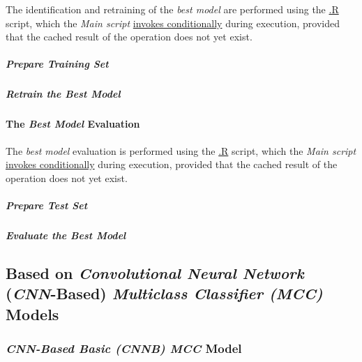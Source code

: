 \documentclass[
]{report}
\begin{document}
\hfill\break

The identification and retraining of the \emph{best model} are performed using the \href{}{.R} script, which the \emph{Main script} \href{https://github.com/AzKurban-edX-DS/edx.capstone.choose-your-own/blob/main/r/index.R\#L}{invokes conditionally} during execution, provided that the cached result of the operation does not yet exist.

\subparagraph{\texorpdfstring{Prepare \emph{Training Set}}{Prepare Training Set}}\label{tdnn.retrain.train_set}

\hfill\break

\subparagraph{\texorpdfstring{Retrain the \emph{Best Model}}{Retrain the Best Model}}\label{tdnn.best.retrain}

\hfill\break

\paragraph{\texorpdfstring{The \emph{Best Model} Evaluation}{The Best Model Evaluation}}\label{tdnn.evaluation_best}

\hfill\break

The \emph{best model} evaluation is performed using the \href{}{.R} script, which the \emph{Main script} \href{https://github.com/AzKurban-edX-DS/edx.capstone.choose-your-own/blob/main/r/index.R\#L}{invokes conditionally} during execution, provided that the cached result of the operation does not yet exist.

\subparagraph{\texorpdfstring{Prepare \emph{Test Set}}{Prepare Test Set}}\label{tdnn.eval.test_set}

\hfill\break

\subparagraph{\texorpdfstring{Evaluate the \emph{Best Model}}{Evaluate the Best Model}}\label{tdnn.best.eval}

\hfill\break

\newpage

\subsection{\texorpdfstring{Based on \emph{Convolutional Neural Network} (\emph{CNN}-Based) \emph{Multiclass Classifier (MCC)} Models}{Based on Convolutional Neural Network (CNN-Based) Multiclass Classifier (MCC) Models}}\label{based-on-convolutional-neural-network-cnn-based-multiclass-classifier-mcc-models}

\subsubsection{\texorpdfstring{\emph{CNN-Based Basic (CNNB) MCC} Model}{CNN-Based Basic (CNNB) MCC Model}}\label{cnnb_model}
\end{document}
